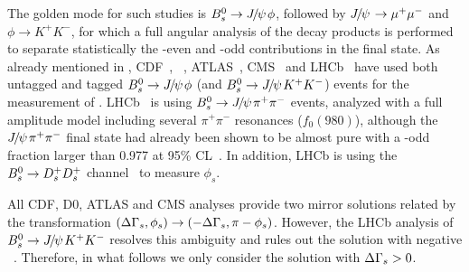 The golden mode for such studies is 
$B^0_s \to {J\mskip -3mu/\mskip -2mu\psi\mskip 2mu}\phi$, followed by ${J\mskip -3mu/\mskip -2mu\psi\mskip 2mu} \to \mu^+\mu^-$ and 
$\phi\to K^+K^-$, for which a full angular 
analysis of the decay products is performed to 
separate statistically the \CP-even and \CP-odd
contributions in the final state. As already mentioned in 
,
CDF~\cite{Aaltonen:2012ie,*CDF:2011af,*Aaltonen:2007he_mod,*Aaltonen:2007gf_mod},
\dzero~\cite{Abazov:2011ry,*Abazov_mod:2008fj,*Abazov:2007tx_mod_cont},
ATLAS~\cite{Aad:2014cqa,*Aad:2012kba_cont}, CMS~\cite{CMS-PAS-BPH-13-012}
and LHCb~\cite{LHCB-PAPER-2014-059,*Aaij:2013oba_supersede2}
have used both untagged and tagged $B^0_s \to {J\mskip -3mu/\mskip -2mu\psi\mskip 2mu}\phi$ (and $B^0_s \to {J\mskip -3mu/\mskip -2mu\psi\mskip 2mu} K^+K^-$) events 
for the measurement of \phiccbars.
LHCb~\cite{Aaij:2014dka,*Aaij:2013oba_supersede}
is using $B^0_s \to {J\mskip -3mu/\mskip -2mu\psi\mskip 2mu} \pi^+\pi^-$ events, 
analyzed with a full amplitude model
including several $\pi^+\pi^-$ resonances (\eg $f_0(980)$),
although the
${J\mskip -3mu/\mskip -2mu\psi\mskip 2mu} \pi^+\pi^-$ final state had already been shown
to be almost \CP pure with a \CP-odd fraction
larger than 0.977 at 95\% CL~\cite{LHCb:2012ae}. 
In addition, LHCb is using the $B^0_s \to D^+_sD^+_s$ channel~\cite{Aaij:2014ywt} to measure $\phi_s$.

All CDF, D0, ATLAS and CMS analyses provide 
two mirror solutions related by the transformation 
$(\Delta\Gamma_{s}, \phi_s) \to (-\Delta\Gamma_{s}, \pi-\phi_s)$. However, the
LHCb analysis of $B^0_s \to {J\mskip -3mu/\mskip -2mu\psi\mskip 2mu} K^+K^-$ resolves this ambiguity and 
rules out the solution with negative \DGs~\cite{Aaij:2012eq}.
Therefore, in what follows we only consider the solution with $\Delta\Gamma_{s} > 0$.


